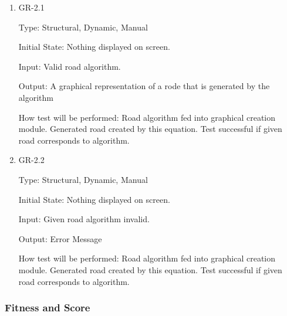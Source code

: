 \documentclass[12pt, titlepage]{article}
\begin{document}
\begin{enumerate}
\item{GR-2.1\\}

Type: Structural, Dynamic, Manual
					
Initial State: Nothing displayed on screen.
					
Input:  Valid road algorithm.
					
Output: A graphical representation of a rode that is generated by the algorithm
					
How test will be performed: Road algorithm fed into graphical creation module. 
Generated road created by this equation. Test successful if given road 
corresponds to algorithm.

\item{GR-2.2\\}

Type: Structural, Dynamic, Manual
					
Initial State: Nothing displayed on screen.
					
Input: Given road algorithm invalid.
					
Output: Error Message
					
How test will be performed: Road algorithm fed into graphical creation module. 
Generated road created by this equation. Test successful if given road 
corresponds to algorithm.

\end{enumerate}

\subsubsection{Fitness and Score}
\end{document}
